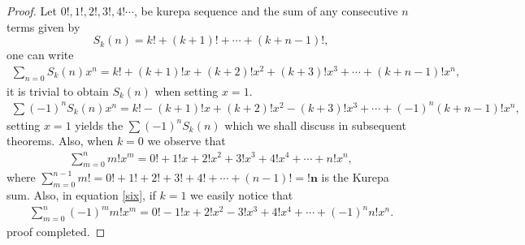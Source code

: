 \documentclass[pdflatex,sn-mathphys-num]{sn-jnl}%
\theoremstyle{thmstyleone}%
\theoremstyle{thmstyletwo}%
\theoremstyle{thmstylethree}%
\begin{document}
\begin{proof}
Let $0!, 1!, 2!, 3!, 4!\cdots$, be kurepa sequence and the sum of any consecutive $n$ terms given by $$S_k(n)= k!+(k+1)!+ \cdots+(k+n-1)!,$$ 
one can write
  \begin{align*}
        \sum_{n=0} S_k(n)x^n= k!+ (k+1)!x +(k+2)!x^2+ (k+3)!x^3 +\cdots+(k+n-1)!x^n,
    \end{align*}  
it is trivial to obtain $ S_k(n)$ when setting $x=1.$ 
 \begin{align*}\label{Kup}
        \sum (-1)^{n}S_k(n)x^n= k!-(k+1)!x+ (k+2)!x^2 -(k+3)!x^3+\cdots+(-1)^n(k+n-1)!x^n,
    \end{align*}
setting $x=1$ yields the $ \sum (-1)^{n}S_k(n)$  which we shall discuss in subsequent theorems. Also, when $k=0$ we observe that
    \begin{align*}
        \sum_{m=0}^{n} m!x^m= 0!+1!x+ 2!x^2 +3!x^3+ 4!x^4 +\cdots+n!x^n,
    \end{align*}
    where $\sum_{m=0}^{n-1} m!= 0! +1! + 2! +3!+ 4! +\cdots+(n-1)!= \mathbf{!n}$ is the Kurepa sum. Also, in equation \ref{six}, if $k=1$ we easily notice that
    \begin{align*}
        \sum_{m=0}^{n} (-1)^{m}m!x^m= 0!-1!x+ 2!x^2 -3!x^3+ 4!x^4 +\cdots+(-1)^n n!x^n.
    \end{align*}
    proof completed.
    


    
\end{proof}
\end{document}
